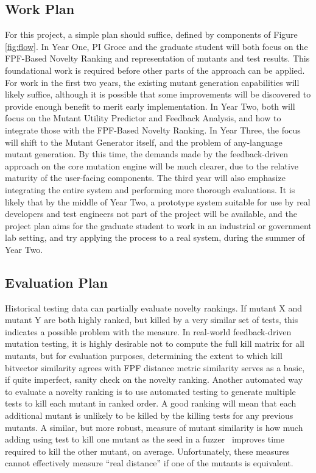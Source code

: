 \subsection{Work Plan}
\label{sec:workplan}


For this project, a simple plan should suffice, defined by components
of Figure \ref{fig:flow}.  In Year One, PI Groce and the graduate
student will both focus on the FPF-Based Novelty Ranking and
representation of mutants and test results.  This foundational work is
required before other parts of the approach can be applied.  For work
in the first two years, the existing mutant generation capabilities
will likely suffice, although it is possible that some improvements
will be discovered to provide enough benefit to merit early
implementation.  In Year
Two, both will focus on the Mutant Utility Predictor and Feedback
Analysis, and how to integrate those with the FPF-Based Novelty
Ranking.  In Year Three, the focus will shift to the Mutant Generator
itself, and the problem of any-language mutant generation.  By this
time, the demands made by the feedback-driven approach on the core
mutation engine will be much clearer, due to the relative maturity of
the user-facing components.  The third
year will also emphasize integrating the entire system and performing
more thorough evaluations.  It is likely that by the middle of Year
Two, a prototype system suitable for use by real developers and test
engineers not part of the project will be available, and the project
plan aims for the graduate student to work in an industrial or
government lab setting, and try applying the process to a real system,
during the summer of Year Two.

\subsection{Evaluation Plan}
\label{sec:evalplan}

Historical testing data can partially evaluate novelty rankings.  If
mutant X and mutant Y are both highly ranked, but killed by a very
similar set of tests, this indicates a possible problem with the
measure.  In real-world feedback-driven mutation testing, it is highly
desirable not to compute the full kill matrix for all mutants, but
for evaluation purposes, determining the extent to which kill
bitvector similarity agrees with FPF distance metric similarity serves
as a basic, if quite imperfect, sanity check on the novelty ranking.
Another automated way to evaluate a novelty ranking is to use automated
testing to generate multiple tests to kill each mutant in ranked order.  A good ranking will mean
that each additional mutant is unlikely to be killed by the killing
tests for any previous mutants.  A similar, but more robust, measure of mutant similarity
is how much adding using test to kill one mutant as the seed in a
fuzzer~\cite{aflfuzz,libfuzzer} improves time required to kill the other
mutant, on average.  Unfortunately, these measures cannot effectively
measure ``real distance'' if one of the mutants is equivalent.

